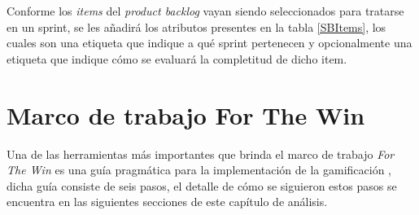  \noindent Conforme los {\it items} del {\it product backlog} vayan siendo seleccionados para
 tratarse en un sprint, se les añadirá los atributos presentes en la tabla \ref{SBItems}, los
 cuales son una etiqueta que indique a qué sprint pertenecen y opcionalmente una etiqueta que
 indique cómo se evaluará la completitud de dicho item.



\section{Marco de trabajo For The Win}
\label{analisis:forthewin}

 Una de las herramientas más importantes que brinda el marco de trabajo {\it For The
 Win} es una guía pragmática para la implementación de la gamificación \cite[p. 8]%
 {ForTheWin}, dicha guía consiste de seis pasos, el detalle de cómo se siguieron
 estos pasos se encuentra en las siguientes secciones de este capítulo de análisis.

